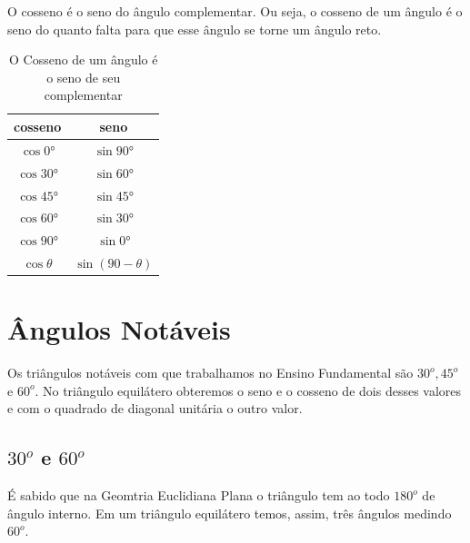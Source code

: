 O cosseno é o seno do ângulo complementar. Ou seja, o cosseno de um ângulo é o seno do quanto falta para que esse ângulo se torne um ângulo reto.

\begin{table}[]
 \centering
 \begin{tabular}{|c|c|}
 \hline
 cosseno & seno \\
 \hline
 $\cos 0°$ & $\sin 90°$\\
 \hline
 $\cos 30°$ & $\sin 60°$\\
 \hline
 $\cos 45°$ & $\sin 45°$\\
 \hline
 $\cos 60°$ & $\sin 30°$\\
 \hline
 $ \cos 90°$ & $\sin 0°$\\
 \hline
 $\cos \theta$ & $\sin (90-\theta)$\\
 \hline
 \end{tabular}
 \caption{O Cosseno de um ângulo é o seno de seu complementar}
 \label{tab:my_label}
\end{table}
\newpage

\section{Ângulos Notáveis}
Os triângulos notáveis com que trabalhamos no Ensino Fundamental são $30^o, 45^o$ e $60^o$. No triângulo equilátero obteremos o seno e o cosseno de dois desses valores e com o quadrado de diagonal unitária o outro valor.

\subsection{$30^o$ e $60^o$}
É sabido que na Geomtria Euclidiana Plana o triângulo tem ao todo $180^o$ de ângulo interno. Em um triângulo equilátero temos, assim, três ângulos medindo $60^o$.
\begin{center}
\end{center}
